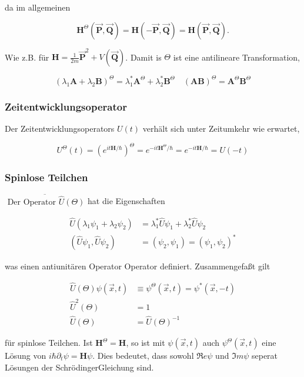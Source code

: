 \documentclass[10pt, letterpaper]{article}
\begin{document}
da im allgemeinen

$$
\mathbf{H}^{\Theta}(\overrightarrow{\mathbf{P}}, \overrightarrow{\mathbf{Q}})=\mathbf{H}(-\overrightarrow{\mathbf{P}}, \overrightarrow{\mathbf{Q}})=\mathbf{H}(\overrightarrow{\mathbf{P}}, \overrightarrow{\mathbf{Q}}) .
$$

Wie z.B. für $\mathbf{H}=\frac{1}{2 m} \overrightarrow{\mathbf{P}}^{2}+V(\overrightarrow{\mathbf{Q}})$. Damit is $\Theta$ ist eine antilineare Transformation,

$$
\left(\lambda_{1} \mathbf{A}+\lambda_{2} \mathbf{B}\right)^{\Theta}=\lambda_{1}^{*} \mathbf{A}^{\Theta}+\lambda_{2}^{*} \mathbf{B}^{\Theta} \quad(\mathbf{A B})^{\Theta}=\mathbf{A}^{\Theta} \mathbf{B}^{\Theta}
$$

\subsubsection*{Zeitentwicklungsoperator}
Der Zeitentwicklungsoperators $U(t)$ verhält sich unter Zeitumkehr wie erwartet,

$$
U^{\Theta}(t)=\left(e^{i t \mathbf{H} / \hbar}\right)^{\Theta}=e^{-i t \mathbf{H}^{\Theta} / \hbar}=e^{-i t \mathbf{H} / \hbar}=U(-t)
$$

\subsubsection*{Spinlose Teilchen}
$\overline{\text { Der Operator } \hat{U}(\Theta)}$ hat die Eigenschaften

$$
\begin{aligned}
\widehat{U}\left(\lambda_{1} \psi_{1}+\lambda_{2} \psi_{2}\right) & =\lambda_{1}^{*} \widehat{U} \psi_{1}+\lambda_{2}^{*} \widehat{U} \psi_{2} \\
\left(\widehat{U} \psi_{1}, \widehat{U} \psi_{2}\right) & =\left(\psi_{2}, \psi_{1}\right)=\left(\psi_{1}, \psi_{2}\right)^{*}
\end{aligned}
$$

was einen antiunitären Operator Operator definiert. Zusammengefaßt gilt

$$
\begin{aligned}
\widehat{U}(\Theta) \psi(\vec{x}, t) & \equiv \psi^{\Theta}(\vec{x}, t)=\psi^{*}(\vec{x},-t) \\
\widehat{U}^{2}(\Theta) & =1 \\
\widehat{U}(\Theta) & =\widehat{U}(\Theta)^{-1}
\end{aligned}
$$

für spinlose Teilchen. Ist $\mathbf{H}^{\Theta}=\mathbf{H}$, so ist mit $\psi(\vec{x}, t)$ auch $\psi^{\Theta}(\vec{x}, t)$ eine Lösung von $i \hbar \partial_{t} \psi=\mathbf{H} \psi$. Dies bedeutet, dass sowohl $\Re e \psi$ und $\Im m \psi$ seperat Lösungen der SchrödingerGleichung sind.
\end{document}
